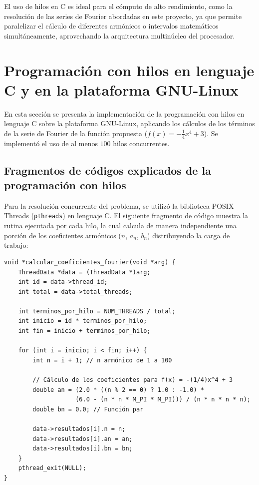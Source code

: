 El uso de hilos en C es ideal para el cómputo de alto rendimiento, como la resolución de las series de Fourier abordadas en este proyecto, ya que permite paralelizar el cálculo de diferentes armónicos o intervalos matemáticos simultáneamente, aprovechando la arquitectura multinúcleo del procesador.

\section{Programación con hilos en lenguaje C y en la plataforma GNU-Linux}

En esta sección se presenta la implementación de la programación con hilos en lenguaje C sobre la plataforma GNU-Linux, aplicando los cálculos de los términos de la serie de Fourier de la función propuesta ($f(x) = -\frac{1}{4}x^4 + 3$). Se implementó el uso de al menos $100$ hilos concurrentes.

\subsection{Fragmentos de códigos explicados de la programación con hilos}
Para la resolución concurrente del problema, se utilizó la biblioteca POSIX Threads (\texttt{pthreads}) en lenguaje C. El siguiente fragmento de código muestra la rutina ejecutada por cada hilo, la cual calcula de manera independiente una porción de los coeficientes armónicos ($n$, $a_n$, $b_n$) distribuyendo la carga de trabajo:

\begin{verbatim}
void *calcular_coeficientes_fourier(void *arg) {
    ThreadData *data = (ThreadData *)arg;
    int id = data->thread_id;
    int total = data->total_threads;

    int terminos_por_hilo = NUM_THREADS / total;
    int inicio = id * terminos_por_hilo;
    int fin = inicio + terminos_por_hilo;

    for (int i = inicio; i < fin; i++) {
        int n = i + 1; // n armónico de 1 a 100
        
        // Cálculo de los coeficientes para f(x) = -(1/4)x^4 + 3
        double an = (2.0 * ((n % 2 == 0) ? 1.0 : -1.0) * 
                    (6.0 - (n * n * M_PI * M_PI))) / (n * n * n * n);
        double bn = 0.0; // Función par

        data->resultados[i].n = n;
        data->resultados[i].an = an;
        data->resultados[i].bn = bn;
    }
    pthread_exit(NULL);
}
\end{verbatim}


